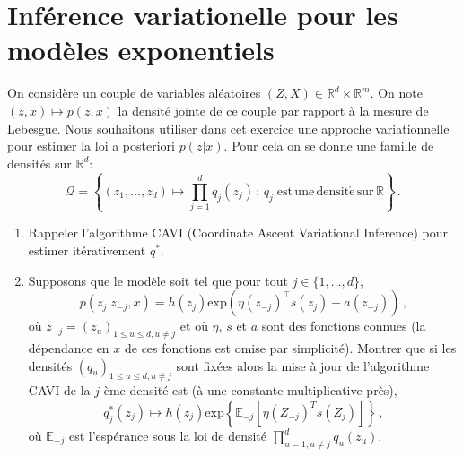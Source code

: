 \documentclass[a4paper,10pt,fleqn]{article}
\newcommand{\eqsp}{\,}
\newcommand{\1}{\ensuremath{\mathbbm{1}}}
\begin{document}
\section{Inf\'erence variationelle pour les mod\`eles exponentiels}
On consid\`ere un couple de variables al\'eatoires $(Z,X)\in\mathbb{R}^d\times \mathbb{R}^m$. On note $(z,x) \mapsto p(z,x)$ la densit\'e jointe de ce couple par rapport \`a la mesure de Lebesgue. Nous souhaitons utiliser dans cet exercice une approche variationnelle pour estimer la loi a posteriori $p(z|x)$. Pour cela on se donne une famille de densit\'es sur $\mathbb{R}^d$:
$$
\mathcal{Q} = \left\{(z_1,\ldots,z_d)\mapsto \prod_{j=1}^dq_j(z_j)\eqsp;\eqsp q_j\; \mathrm{est\,une\,densit\acute e\,sur\,\mathbb{R}}\right\}\eqsp.
$$
\begin{enumerate}
\item Rappeler l'algorithme CAVI (Coordinate Ascent Variational Inference) pour estimer it\'erativement $q^*$.
%
%
\item Supposons que le mod\`ele soit tel que pour tout $j\in\{1,\ldots,d\}$, 
$$
p(z_j|z_{-j},x) = h(z_j)\mathrm{exp}(\eta(z_{-j})^\top s(z_j) - a(z_{-j}))\eqsp,
$$ 
o\`u $z_{-j} = (z_u)_{1\leqslant u\leqslant d, u \neq j}$ et o\`u $\eta$, $s$ et $a$ sont des fonctions connues (la d\'ependance en $x$ de ces fonctions est omise par simplicit\'e). Montrer que si les densit\'es $(q_u)_{1\leqslant u\leqslant d, u \neq j}$ sont fix\'ees alors la mise \`a jour de l'algorithme CAVI de la $j$-\`eme densit\'e est  (\`a une constante multiplicative pr\`es),
$$
q^*_j(z_j) \mapsto h(z_j) \mathrm{exp}\left\{\mathbb{E}_{-j}[\eta(Z_{-j})^Ts(Z_j)]\right\}\eqsp,
$$
o\`u $\mathbb{E}_{-j}$ est l'esp\'erance sous la loi de densit\'e $\prod_{u=1, u\neq j}^d q_u(z_u)$.


\end{enumerate}
\end{document}
